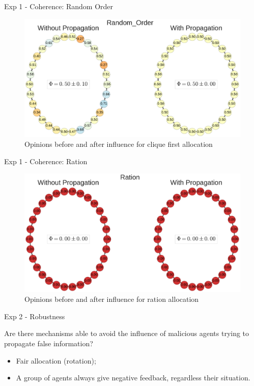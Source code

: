 \begin{frame}{Exp 1 - Coherence: Random Order}

\begin{figure}[htbp]
\centering
\includegraphics{pics/voices_exp1_random_order.pdf}
\caption{Opinions before and after influence for clique first
allocation}
\end{figure}

\end{frame}

\begin{frame}{Exp 1 - Coherence: Ration}

\begin{figure}[htbp]
\centering
\includegraphics{pics/voices_exp1_ration.pdf}
\caption{Opinions before and after influence for ration allocation}
\end{figure}

\end{frame}

\begin{frame}{Exp 2 - Robustness}

\begin{block}{}
Are there mechanisms able to avoid the influence of malicious agents trying to propagate false information?
\end{block}

\begin{itemize}
\tightlist
\item
  Fair allocation (rotation);
\item
  A group of agents always give negative feedback, regardless their
  situation.
\end{itemize}

\end{frame}

